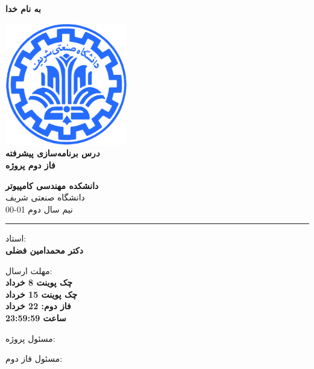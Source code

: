 \documentclass[]{article}
\begin{document}
\begin{titlepage}
\begin{center}

\textbf{ \Huge{به نام خدا} }
        
\vspace{0.2cm}

\includegraphics[width=0.4\textwidth]{sharif1.png}\\
\vspace{0.2cm}
\textbf{ \Huge{\emph درس برنامه‌سازی پیشرفته} }\\
\vspace{0.25cm}
\textbf{ \Large{ فاز دوم پروژه} }
\vspace{0.2cm}
       
 
      \large \textbf{دانشکده مهندسی کامپیوتر}\\\vspace{0.1cm}
    \large   دانشگاه صنعتی شریف\\\vspace{0.2cm}
       \large   ﻧﯿﻢ سال دوم 01-00 \\\vspace{0.10cm}
      \noindent\rule[1ex]{\linewidth}{1pt}
استاد:\\
    \textbf{{دکتر محمدامین فضلی}}



    \vspace{0.20cm}

   مهلت ارسال:\\
    \textbf{{چک پوینت 8 خرداد}}\\
    \textbf{{چک پوینت 15 خرداد}}\\
    \textbf{{فاز دوم: 22 خرداد}}\\
    \textbf{{ساعت 23:59:59}}

    \vspace{0.10cm}
مسئول پروژه:\\
    \textbf{}
    
        \vspace{0.10cm}
مسئول فاز دوم:\\
    \textbf{}
    

\end{center}
\end{titlepage}
\end{document}
